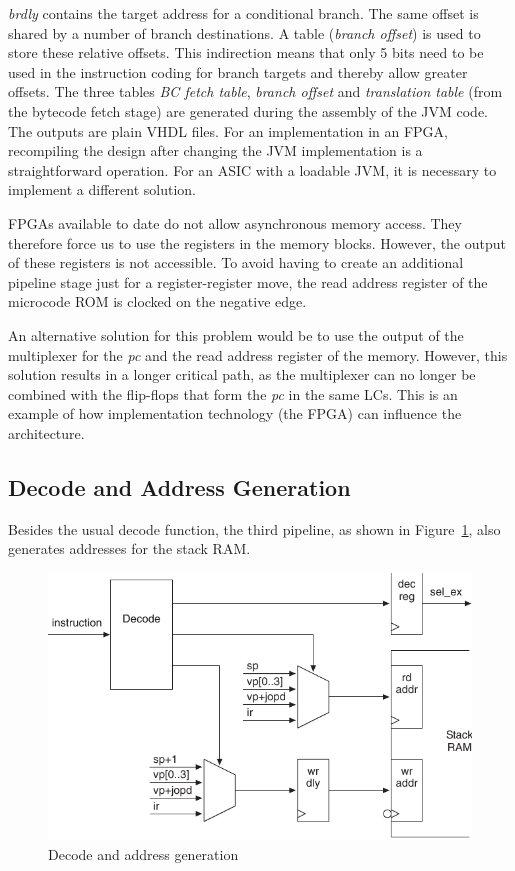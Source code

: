 \emph{brdly} contains the target address for a conditional branch.
The same offset is shared by a number of branch destinations. A
table (\emph{branch offset}) is used to store these relative
offsets. This indirection means that only 5 bits need to be used in
the instruction coding for branch targets and thereby allow greater
offsets. The three tables \emph{BC fetch table}, \emph{branch
offset} and \emph{translation table} (from the bytecode fetch stage)
are generated during the assembly of the JVM code. The outputs are
plain VHDL files. For an implementation in an FPGA, recompiling the
design after changing the JVM implementation is a straightforward
operation. For an ASIC with a loadable JVM, it is necessary to
implement a different solution.

FPGAs available to date do not allow asynchronous memory access.
They therefore force us to use the registers in the memory blocks.
However, the output of these registers is not accessible. To avoid
having to create an additional pipeline stage just for a
register-register move, the read address register of the microcode
ROM is clocked on the negative edge.

An alternative solution for this problem would be to use the output
of the multiplexer for the \emph{pc} and the read address register
of the memory. However, this solution results in a longer critical
path, as the multiplexer can no longer be combined with the
flip-flops that form the \emph{pc} in the same LCs. This is an
example of how implementation technology (the FPGA) can influence
the architecture.

\subsection{Decode and Address Generation}

Besides the usual decode function, the third pipeline, as shown in
Figure~\ref{fig_arch_decode}, also generates addresses for the stack
RAM.

\begin{figure}
    \centering
    \includegraphics[scale=\picscale]{arch/arch_decaddr}
    \caption{Decode and address generation}
    \label{fig_arch_decode}
\end{figure}



